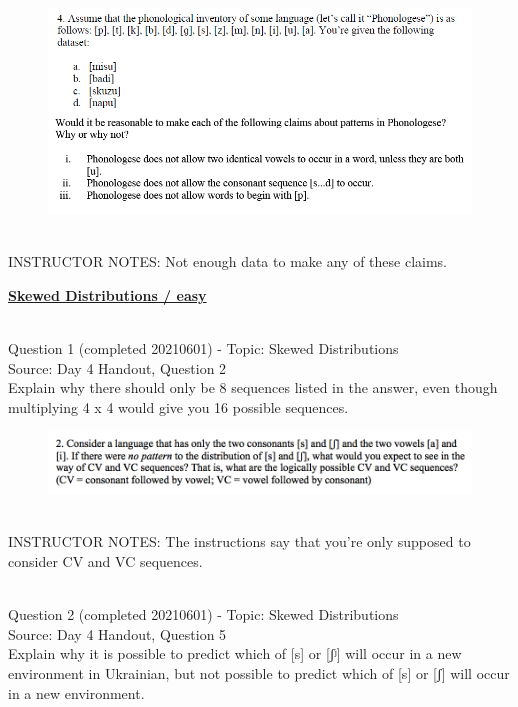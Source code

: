 \documentclass[12pt]{article}
\begin{document}
\begin{figure}[H]
\includegraphics{../images/Phonologese.png}
\end{figure}

~\\
INSTRUCTOR NOTES: Not enough data to make any of these claims.


\newpage\textbf{\underline{\huge Skewed Distributions / easy\\}}

~\\

{\large Question 1} (completed 20210601) - Topic: Skewed Distributions\\
Source: Day 4 Handout, Question 2\\

Explain why there should only be 8 sequences listed in the answer, even though multiplying 4 x 4 would give you 16 possible sequences.\\

\begin{figure}[H]
\includegraphics{../images/skew2.png}
\end{figure}

~\\
INSTRUCTOR NOTES: The instructions say that you're only supposed to consider CV and VC sequences. 


~\\

{\large Question 2} (completed 20210601) - Topic: Skewed Distributions\\
Source: Day 4 Handout, Question 5\\

Explain why it is possible to predict which of [s] or [ʃʲ] will occur in a new environment in Ukrainian, but not possible to predict which of [s] or [ʃ] will occur in a new environment.\\
\end{document}

